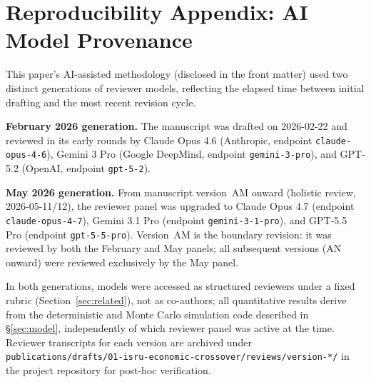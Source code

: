 \section{Reproducibility Appendix: AI Model Provenance}
\label{sec:appendix_model_provenance}

This paper's AI-assisted methodology (disclosed in the front matter) used two distinct generations of reviewer models, reflecting the elapsed time between initial drafting and the most recent revision cycle.

\textbf{February 2026 generation.} The manuscript was drafted on 2026-02-22 and reviewed in its early rounds by Claude Opus 4.6 (Anthropic, endpoint \texttt{claude-opus-4-6}), Gemini 3 Pro (Google DeepMind, endpoint \texttt{gemini-3-pro}), and GPT-5.2 (OpenAI, endpoint \texttt{gpt-5-2}).

\textbf{May 2026 generation.} From manuscript version~AM onward (holistic review, 2026-05-11/12), the reviewer panel was upgraded to Claude Opus 4.7 (endpoint \texttt{claude-opus-4-7}), Gemini 3.1 Pro (endpoint \texttt{gemini-3-1-pro}), and GPT-5.5 Pro (endpoint \texttt{gpt-5-5-pro}). Version~AM is the boundary revision: it was reviewed by both the February and May panels; all subsequent versions (AN onward) were reviewed exclusively by the May panel.

In both generations, models were accessed as structured reviewers under a fixed rubric (Section~\ref{sec:related}), not as co-authors; all quantitative results derive from the deterministic and Monte Carlo simulation code described in \S\ref{sec:model}, independently of which reviewer panel was active at the time. Reviewer transcripts for each version are archived under \texttt{publications/drafts/\allowbreak{}01-isru-economic-crossover/\allowbreak{}reviews/\allowbreak{}version-*/} in the project repository for post-hoc verification.

